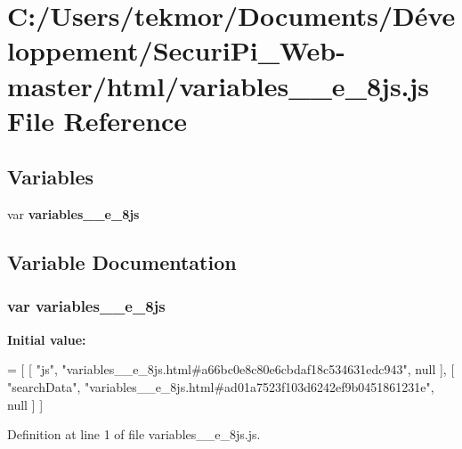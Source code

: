 \section{C\+:/\+Users/tekmor/\+Documents/\+Développement/\+Securi\+Pi\+\_\+\+Web-\/master/html/variables\+\_\+\+\_\+e\+\_\+8js.js File Reference}
\label{variables____e__8js_8js}
\subsection*{Variables}
\begin{DoxyCompactItemize}
\item 
var {\bf variables\+\_\+\+\_\+e\+\_\+8js}
\end{DoxyCompactItemize}


\subsection{Variable Documentation}
\subsubsection[{variables\+\_\+\+\_\+e\+\_\+8js}]{\setlength{\rightskip}{0pt plus 5cm}var variables\+\_\+\+\_\+e\+\_\+8js}\label{variables____e__8js_8js_a1b1dd5e23507968055b5202866e3f44d}
{\bfseries Initial value\+:}
\begin{DoxyCode}
=
[
    [ \textcolor{stringliteral}{"js"}, \textcolor{stringliteral}{"variables\_\_e\_8js.html#a66bc0e8c80e6cbdaf18c534631edc943"}, null ],
    [ \textcolor{stringliteral}{"searchData"}, \textcolor{stringliteral}{"variables\_\_e\_8js.html#ad01a7523f103d6242ef9b0451861231e"}, null ]
]
\end{DoxyCode}


Definition at line 1 of file variables\+\_\+\+\_\+e\+\_\+8js.\+js.

